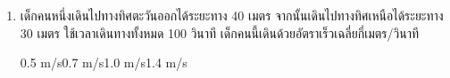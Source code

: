 \begin{enumerate}
	\item \runningj  \nonet เด็กคนหนึ่งเดินไปทางทิศตะวันออกได้ระยะทาง  40  เมตร  จากนั้นเดินไปทางทิศเหนือได้ระยะทาง  30  เมตร  ใช้เวลาเดินทางทั้งหมด  100  วินาที  เด็กคนนี้เดินด้วยอัตราเร็วเฉลี่ยกี่เมตร/วินาที 
	\begin{2c}
		{0.5 m/s}{0.7 m/s}{1.0 m/s}{1.4 m/s}
	\end{2c}
\end{enumerate}
